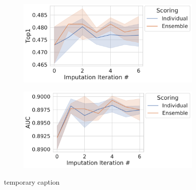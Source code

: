 \documentclass[journal=jmcmar,manuscript=article]{achemso}
\begin{document}
\begin{figure}[tbph]
    \begin{subfigure}[t]{0.48\textwidth}
        \centering
        \includegraphics[width=\linewidth]{figures/InitialImpTop1.pdf}
    \end{subfigure}
    \hfill
    \begin{subfigure}[t]{0.48\textwidth}
        \centering
        \includegraphics[width=\linewidth]{figures/InitialImpAUC.pdf}
    \end{subfigure}
    \caption{temporary caption}
    \label{fig:initialImp}
\end{figure}
\end{document}
